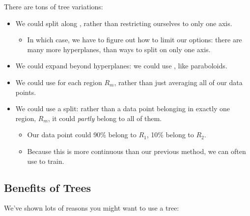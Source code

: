         There are tons of tree variations:

        \begin{itemize}
            \item We could split along , rather than restricting ourselves to only one axis.
                \begin{itemize}
                    \item In which case, we have to figure out how to limit our options: there are many more hyperplanes, than ways to split on only one axis.
                \end{itemize}

            \item We could expand beyond hyperplanes: we could use , like paraboloids.

            \item We could use  for each region $R_m$, rather than just averaging all of our data points.

            \item We could use a  split: rather than a data point belonging in exactly one region, $R_m$, it could \textit{partly} belong to all of them.
                
                \begin{itemize}
                    \item \miniex Our data point could 90\% belong to $R_1$, 10\% belong to $R_2$.

                    \item Because this is more continuous than our previous method, we can often use  to train.
                \end{itemize}
        \end{itemize}



    \phantom{}

    \subsection{Benefits of Trees}


        We've shown lots of reasons you might want to use a tree:

